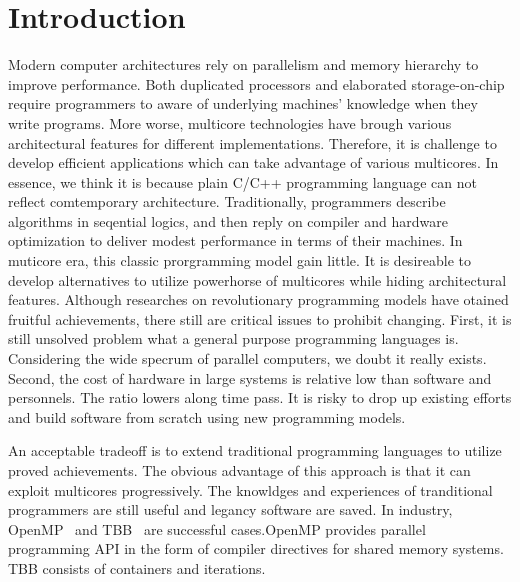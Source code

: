 

\section{Introduction}\label{sec:Intro}
Modern computer architectures rely on parallelism and memory
hierarchy to improve performance. Both duplicated processors and
elaborated storage-on-chip require programmers to aware of underlying
machines' knowledge when they write programs. More worse,
multicore technologies have brough various architectural features for
different implementations. Therefore, it is challenge to develop
efficient applications which can take advantage of various multicores.
In essence, we think it is because plain C/C++ programming language
can not reflect comtemporary architecture. Traditionally, programmers
describe algorithms in seqential logics, and then reply on compiler
and hardware optimization to deliver modest performance in terms of
their machines. In muticore era, this classic prorgramming model gain
little. It is desireable to develop alternatives to utilize powerhorse
of multicores while hiding architectural features.
Although researches on revolutionary programming models have otained
fruitful achievements, there still are critical issues to prohibit
changing. First, it is still unsolved problem what a general purpose programming
languages is. Considering the wide specrum of parallel computers, we
doubt it really exists. Second, the cost of hardware in large systems
is relative low than software and personnels. The ratio lowers along time
pass. It is risky to drop up existing efforts and build software from
scratch using new programming models.

An acceptable tradeoff is to extend traditional programming
languages to utilize proved achievements. The obvious advantage of
this approach is that it can exploit multicores progressively. The knowldges and
experiences of tranditional programmers are still useful and legancy
software are saved. In industry, OpenMP~\cite{openmp}  and
TBB~\cite{tbb} are successful cases.OpenMP provides parallel
programming API in the form of compiler directives for shared memory
systems. TBB consists of containers and iterations.

